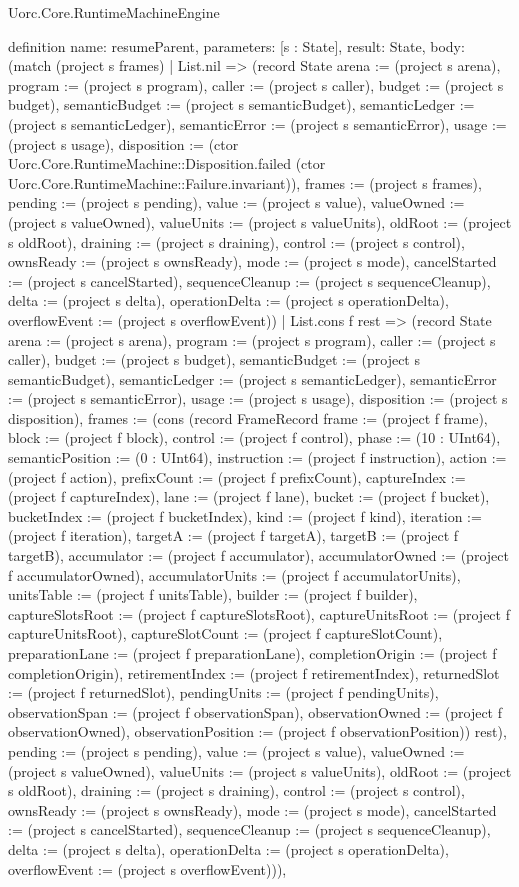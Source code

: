 \begin{lexlean}{Uorc.Core.RuntimeMachineEngine}
\begin{semanticmodule}
definition{
  name: resumeParent,
  parameters: [s : State],
  result: State,
  body: (match (project s frames)
    | List.nil => (record State {arena := (project s arena), program := (project s program), caller := (project s caller), budget := (project s budget), semanticBudget := (project s semanticBudget), semanticLedger := (project s semanticLedger), semanticError := (project s semanticError), usage := (project s usage), disposition := (ctor Uorc.Core.RuntimeMachine::Disposition.failed (ctor Uorc.Core.RuntimeMachine::Failure.invariant)), frames := (project s frames), pending := (project s pending), value := (project s value), valueOwned := (project s valueOwned), valueUnits := (project s valueUnits), oldRoot := (project s oldRoot), draining := (project s draining), control := (project s control), ownsReady := (project s ownsReady), mode := (project s mode), cancelStarted := (project s cancelStarted), sequenceCleanup := (project s sequenceCleanup), delta := (project s delta), operationDelta := (project s operationDelta), overflowEvent := (project s overflowEvent)})
    | List.cons f rest => (record State {arena := (project s arena), program := (project s program), caller := (project s caller), budget := (project s budget), semanticBudget := (project s semanticBudget), semanticLedger := (project s semanticLedger), semanticError := (project s semanticError), usage := (project s usage), disposition := (project s disposition), frames := (cons (record FrameRecord {frame := (project f frame), block := (project f block), control := (project f control), phase := (10 : UInt64), semanticPosition := (0 : UInt64), instruction := (project f instruction), action := (project f action), prefixCount := (project f prefixCount), captureIndex := (project f captureIndex), lane := (project f lane), bucket := (project f bucket), bucketIndex := (project f bucketIndex), kind := (project f kind), iteration := (project f iteration), targetA := (project f targetA), targetB := (project f targetB), accumulator := (project f accumulator), accumulatorOwned := (project f accumulatorOwned), accumulatorUnits := (project f accumulatorUnits), unitsTable := (project f unitsTable), builder := (project f builder), captureSlotsRoot := (project f captureSlotsRoot), captureUnitsRoot := (project f captureUnitsRoot), captureSlotCount := (project f captureSlotCount), preparationLane := (project f preparationLane), completionOrigin := (project f completionOrigin), retirementIndex := (project f retirementIndex), returnedSlot := (project f returnedSlot), pendingUnits := (project f pendingUnits), observationSpan := (project f observationSpan), observationOwned := (project f observationOwned), observationPosition := (project f observationPosition)}) rest), pending := (project s pending), value := (project s value), valueOwned := (project s valueOwned), valueUnits := (project s valueUnits), oldRoot := (project s oldRoot), draining := (project s draining), control := (project s control), ownsReady := (project s ownsReady), mode := (project s mode), cancelStarted := (project s cancelStarted), sequenceCleanup := (project s sequenceCleanup), delta := (project s delta), operationDelta := (project s operationDelta), overflowEvent := (project s overflowEvent)})),
}
\end{semanticmodule}
\end{lexlean}

